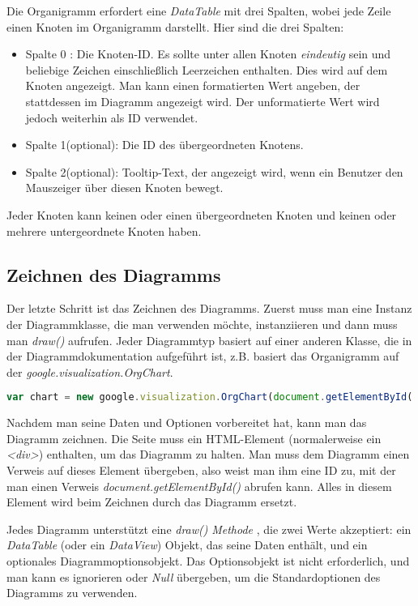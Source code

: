 Die Organigramm erfordert eine \textit{DataTable} mit drei Spalten, wobei jede Zeile einen Knoten im Organigramm darstellt. Hier sind die drei Spalten:
\begin{itemize}
\item	Spalte 0 : Die Knoten-ID. Es sollte unter allen Knoten \textit{eindeutig} sein und beliebige Zeichen einschließlich Leerzeichen enthalten. Dies wird auf dem Knoten angezeigt. Man kann einen formatierten Wert angeben, der stattdessen im Diagramm angezeigt wird. Der unformatierte Wert wird jedoch weiterhin als ID verwendet.
\item 	Spalte 1(optional): Die ID des übergeordneten Knotens. 
\item	Spalte 2(optional): Tooltip-Text, der angezeigt wird, wenn ein Benutzer den Mauszeiger über diesen Knoten bewegt.
\end{itemize}
Jeder Knoten kann keinen oder einen übergeordneten Knoten und keinen oder mehrere untergeordnete Knoten haben.

\subsection{Zeichnen des Diagramms}
Der letzte Schritt ist das Zeichnen des Diagramms. Zuerst muss man eine Instanz der Diagrammklasse, die man verwenden möchte, instanziieren und dann muss man \textit{draw()} aufrufen.
Jeder Diagrammtyp basiert auf einer anderen Klasse, die in der Diagrammdokumentation aufgeführt ist, z.B. basiert das Organigramm auf der \textit{google.visualization.OrgChart}. 

\begin{lstlisting}[language=JavaScript,basicstyle=\scriptsize]
var chart = new google.visualization.OrgChart(document.getElementById('chart_div'));
\end{lstlisting}

Nachdem man seine Daten und Optionen vorbereitet hat, kann man das Diagramm zeichnen. Die Seite muss ein HTML-Element (normalerweise ein \textit{<div>}) enthalten, um das Diagramm zu halten. Man muss dem Diagramm einen Verweis auf dieses Element übergeben, also weist man ihm eine ID zu, mit der man einen Verweis \textit{document.getElementById()} abrufen kann. Alles in diesem Element wird beim Zeichnen durch das Diagramm ersetzt. 

Jedes Diagramm unterstützt eine \textit{draw()} \textit{Methode} \cite{drawCharts}, die zwei Werte akzeptiert: ein \textit{DataTable} (oder ein \textit{DataView}) Objekt, das seine Daten enthält, und ein optionales Diagrammoptionsobjekt. Das Optionsobjekt ist nicht erforderlich, und man kann es ignorieren oder \textit{Null} übergeben, um die Standardoptionen des Diagramms zu verwenden.


